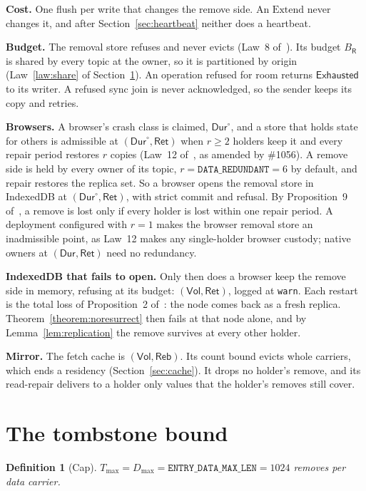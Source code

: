 \documentclass[journal]{IEEEtran}
\newtheorem{definition}{Definition}
\newcommand{\Volatile}{\mathsf{Vol}}
\newcommand{\Durable}{\mathsf{Dur}}
\newcommand{\Rebuild}{\mathsf{Reb}}
\newcommand{\Retained}{\mathsf{Ret}}
\newcommand{\Exhausted}{\mathsf{Exhausted}}
\newcommand{\Rm}{\mathsf{R}}
\newcommand{\Tmax}{T_{\max}}
\newcommand{\Dmax}{D_{\max}}
\newcommand{\issue}[1]{\#{#1}}
\begin{document}
\textbf{Cost.}  One flush per write that changes the remove side.  An $\mathrm{Extend}$ never
changes it, and after Section~\ref{sec:heartbeat} neither does a heartbeat.

\textbf{Budget.}  The removal store refuses and never evicts (Law~8 of~\cite{DurableRecords}).
Its budget $B_\Rm$ is shared by every topic at the owner, so it is partitioned by origin
(Law~\ref{law:share} of Section~\ref{sec:bound}).  An operation refused for room returns
$\Exhausted$ to its writer.  A refused sync join is never acknowledged, so the sender keeps its
copy and retries.

\textbf{Browsers.}  A browser's crash class is claimed, $\Durable^\circ$, and a store that
holds state for others is admissible at $(\Durable^\circ,\Retained)$ when $r\ge2$ holders keep
it and every repair period restores $r$ copies (Law~12 of~\cite{DurableRecords}, as amended by
\issue{1056}).  A remove side is held by every owner of its topic, $r=\mathtt{DATA\_REDUNDANT}=6$
by default, and repair restores the replica set.  So a browser opens the removal store in
IndexedDB at $(\Durable^\circ,\Retained)$, with strict commit and refusal.  By Proposition~9
of~\cite{DurableRecords}, a remove is lost only if every holder is lost within one repair
period.  A deployment configured with $r=1$ makes the browser removal store an inadmissible
point, as Law~12 makes any single-holder browser custody; native owners at
$(\Durable,\Retained)$ need no redundancy.

\textbf{IndexedDB that fails to open.}  Only then does a browser keep the remove side in
memory, refusing at its budget: $(\Volatile,\Retained)$, logged at \texttt{warn}.  Each restart
is the total loss of Proposition~2 of~\cite{DurableRecords}: the node comes back as a fresh
replica.  Theorem~\ref{theorem:noresurrect} then fails at that node alone, and by
Lemma~\ref{lem:replication} the remove survives at every other holder.

\textbf{Mirror.}  The fetch cache is $(\Volatile,\Rebuild)$.  Its count bound evicts whole
carriers, which ends a residency (Section~\ref{sec:cache}).  It drops no holder's remove, and
its read-repair delivers to a holder only values that the holder's removes still cover.

\section{The tombstone bound}\label{sec:bound}

\begin{definition}[Cap]\label{def:cap}
$\Tmax=\Dmax=\mathtt{ENTRY\_DATA\_MAX\_LEN}=1024$ removes per data carrier.
\end{definition}
\end{document}
